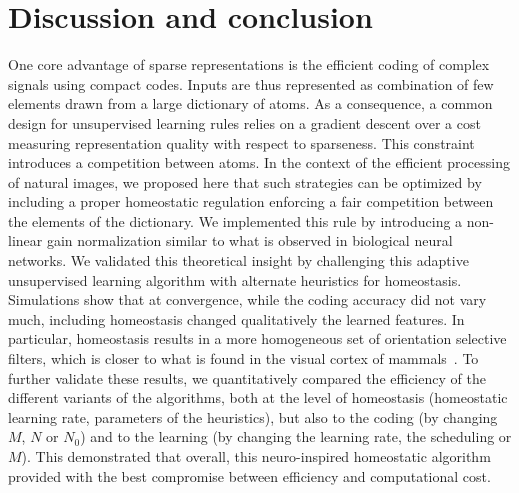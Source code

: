 \documentclass[draft]{article} %
\begin{document}
\section{Discussion and conclusion}\label{discussion-et-conclusion}
One core advantage of sparse representations is the efficient coding of complex signals using compact codes. Inputs are thus represented as combination of few elements drawn from a large dictionary of atoms. As a consequence, a common design for unsupervised learning rules relies on a gradient descent over a cost measuring representation quality with respect to sparseness. This constraint introduces a competition between atoms. In the context of the efficient processing of natural images, we proposed here that such strategies can be optimized by including a proper homeostatic regulation enforcing a fair competition between the elements of the dictionary. We implemented this rule by introducing a non-linear gain normalization similar to what is observed in biological neural networks. We validated this theoretical insight by challenging this adaptive unsupervised learning algorithm with alternate heuristics for homeostasis. Simulations show that at convergence, while the coding accuracy did not vary much, including homeostasis changed qualitatively the learned features. In particular, homeostasis results in a more homogeneous set of orientation selective filters, which is closer to what is found in the visual cortex of mammals~\citep{Ringach02,Rehn07,Loxley17}. To further validate these results, we quantitatively compared the efficiency of the different variants of the algorithms, both at the level of homeostasis (homeostatic learning rate, parameters of the heuristics), but also to the coding (by changing $M$, $N$ or $N_0$) and to the learning (by changing the learning rate, the scheduling or $M$). This demonstrated that overall, this neuro-inspired homeostatic algorithm provided with the best compromise between efficiency and computational cost. 
\end{document}
